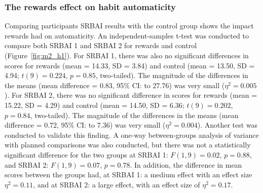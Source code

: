 \documentclass{scaffold/sigchi}
\begin{document}
\subsubsection{The rewards effect on habit automaticity}
Comparing participants SRBAI results with the control group shows the impact rewards had on automaticity.
An independent-samples t-test was conducted to compare both SRBAI 1 and SRBAI 2 for rewards and control (Figure~\ref{fig:m2_h1}). For SRBAI 1, there was also no significant differences in scores for rewards (mean = 14.33, SD = 3.84) and control (mean = 13.50, SD = 4.94; $t(9) = 0.224$, $p = 0.85$,
two-tailed). The magnitude of the differences in the means (mean difference = 0.83,
95\% CI:  to 27.76) was very small ($\eta^{2} = 0.005$). For SRBAI 2, there was no significant difference in scores for rewards
(mean = 15.22, SD = 4.29) and control (mean = 14.50, SD = 6.36; $t(9) = 0.202$, $p = 0.84$,
two-tailed). The magnitude of the differences in the means (mean difference = 0.72,
95\% CI:  to 7.36) was very small ($\eta^{2} = 0.004$). Another test was conducted to validate this finding. A one-way between-groups analysis of variance with planned comparisons was also conducted, but there was not a statistically significant difference for the two groups at SRBAI 1: $F(1,9) = 0.02$, $p = 0.88$, and SRBAI 2: $F(1,9) = 0.07$, $p = 0.78$. In addition, the difference in mean scores between the groups had, at SRBAI 1: a medium effect with an effect size $\eta^{2} = 0.11$, and at SRBAI 2: a large effect, with an effect size of $\eta^{2} = 0.17$.

\end{document}
